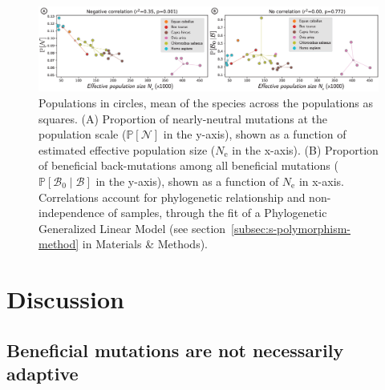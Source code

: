 \documentclass[9pt,twocolumn,twoside,lineno]{pnas-new}
\newcommand{\Ne}{N_{\text{e}}}
\newcommand{\proba}{\mathbb{P}}
\newcommand{\SphyBen}{\mathcal{B}_0}
\newcommand{\given}{\mid}
\newcommand{\SpopNeu}{\mathcal{N}}
\newcommand{\SpopBen}{\mathcal{B}}
\begin{document}
\begin{figure}[htb]
       \centering
       \includegraphics[width=17.8cm, page=1]{figure4}
       \caption{
              Populations in circles, mean of the species across the populations as squares.
              (A) Proportion of nearly-neutral mutations at the population scale ($\proba [ \SpopNeu]$ in the y-axis), shown as a function of estimated effective population size ($\Ne$ in the x-axis).
              (B) Proportion of beneficial back-mutations among all beneficial mutations ($\proba [ \SphyBen  \given  \SpopBen]$ in the y-axis), shown as a function of $\Ne$ in x-axis.
              Correlations account for phylogenetic relationship and non-independence of samples, through the fit of a Phylogenetic Generalized Linear Model (see section~\ref{subsec:s-polymorphism-method} in Materials \& Methods).
       }
       \label{fig:diversity}
\end{figure}

\section*{Discussion}\label{sec:discussion}

\subsection*{Beneficial mutations are not necessarily adaptive}
\end{document}
